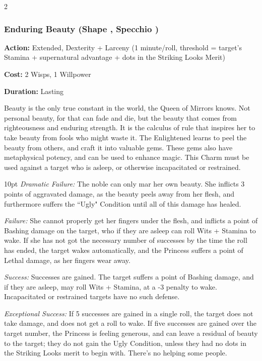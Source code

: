 \begin{multicols}{2}
\subsubsection*{Enduring Beauty (Shape \textbullet\textbullet\textbullet\textbullet, Specchio \textbullet\textbullet\textbullet\textbullet)}

\noindent \textbf{Action:} Extended, Dexterity + Larceny (1 minute/roll, threshold = target's Stamina + supernatural advantage + dots in the Striking Looks Merit)

\noindent \textbf{Cost:} 2 Wisps, 1 Willpower

\noindent \textbf{Duration:} Lasting

Beauty is the only true constant in the world, the Queen of Mirrors knows. Not personal beauty, for that can fade and die, but the beauty that comes from righteousness and enduring strength. It is the calculus of rule that inspires her to take beauty from fools who might waste it. The Enlightened learns to peel the beauty from others, and craft it into valuable gems. These gems also have metaphysical potency, and can be used to enhance magic. This Charm must be used against a target who is asleep, or otherwise incapacitated or restrained.

\begin{myindentpar}{10pt}    \emph{Dramatic Failure:} The noble can only mar her own beauty. She inflicts 3 points of aggravated damage, as the beauty peels away from her flesh, and furthermore suffers the \textquotedblleft Ugly" Condition until all of this damage has healed.

    \emph{Failure:} She cannot properly get her fingers under the flesh, and inflicts a point of Bashing damage on the target, who if they are asleep can roll Wits + Stamina to wake. If she has not got the necessary number of successes by the time the roll has ended, the target wakes automatically, and the Princess suffers a point of Lethal damage, as her fingers wear away.

    \emph{Success:} Successes are gained. The target suffers a point of Bashing damage, and if they are asleep, may roll Wits + Stamina, at a -3 penalty to wake. Incapacitated or restrained targets have no such defense.

    \emph{Exceptional Success:} If 5 successes are gained in a single roll, the target does not take damage, and does not get a roll to wake. If five successes are gained over the target number, the Princess is feeling generous, and can leave a residual of beauty to the target; they do not gain the Ugly Condition, unless they had no dots in the Striking Looks merit to begin with. There's no helping some people.\end{myindentpar}


\end{multicols}
